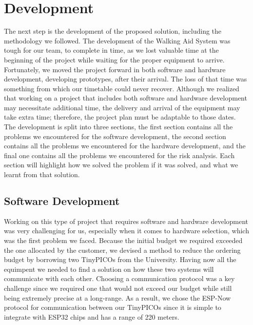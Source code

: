     \section{Development}
    \label{sec:development}

    The next step is the development of the proposed solution, including the methodology we followed. The development of the Walking Aid System was tough for our team, to complete in time, as we lost valuable time at the beginning of the project while waiting for the proper equipment to arrive. Fortunately, we moved the project forward in both software and hardware development, developing prototypes, after their arrival. The loss of that time was something from which our timetable could never recover. Although we realized that working on a project that includes both software and hardware development may necessitate additional time, the delivery and arrival of the equipment may take extra time; therefore, the project plan must be adaptable to those dates. The development is split into three sections, the first section contains all the problems we encountered for the software development, the second section contains all the problems we encountered for the hardware development, and the final one contains all the problems we encountered for the risk analysis. Each section will highlight how we solved the problem if it was solved, and what we learnt from that solution.

    \subsection{Software Development}
    \label{ssec:software}

    Working on this type of project that requires software and hardware development was very challenging for us, especially when it comes to hardware selection, which was the first problem we faced. Because the initial budget we required exceeded the one allocated by the customer, we devised a method to reduce the ordering budget by borrowing two TinyPICOs from the University. Having now all the equimpent we needed to find a solution on how these two systems will communicate with each other. Choosing a communication protocol was a key challenge since we required one that would not exceed our budget while still being extremely precise at a long-range. As a result, we chose the ESP-Now protocol for communication between our TinyPICOs since it is simple to integrate with ESP32 chips and has a range of 220 meters.

